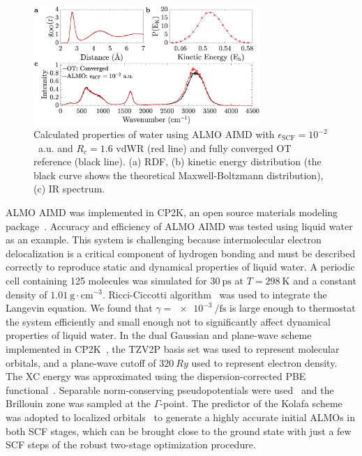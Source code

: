 \documentclass[aps,prl,reprint,amsmath,amssymb]{revtex4-1}
\begin{document}
\begin{figure}
\includegraphics[trim={1.3cm 0.1cm 3.3cm 1.3cm},clip,width=8.6cm]{Dynamical_Data_Tiled.eps}
\caption{\label{fig:dynproperties} 
Calculated properties of water using ALMO AIMD with $\epsilon_{\text{SCF}} = 10^{-2}$~a.u. and $R_{c} = 1.6$ vdWR (red line) and fully converged OT reference (black line).
(a) RDF, 
(b) kinetic energy distribution (the black curve shows the theoretical Maxwell-Boltzmann distribution), 
(c) IR spectrum.
}
\end{figure}

ALMO AIMD was implemented in CP2K, an open source materials modeling package~\cite{www:cp2k}. 
Accuracy and efficiency of ALMO AIMD was tested using liquid water as an example. 
This system is challenging because intermolecular electron delocalization is a critical component of hydrogen bonding and must be described correctly to reproduce static and dynamical properties of liquid water. 
A periodic cell containing 125 molecules was simulated for $\SI{30}{\ps}$ at $T=\SI{298}{\K}$ and a constant density of $\SI{1.01}{\g\cdot\cm^{-3}}$. 
Ricci-Ciccotti algorithm~\cite{Ricci2003} was used to integrate the Langevin equation. We found that $\gamma = \SI{e-3}{\per\fs}$ is large enough to thermostat the system efficiently and small enough not to significantly affect dynamical properties of liquid water.
%
In the dual Gaussian and plane-wave scheme implemented in CP2K~\cite{a:quickstep}, the TZV2P basis set was used to represent molecular orbitals, and a plane-wave cutoff of $\SI{320}{Ry}$ used to represent electron density. 
The XC energy was approximated using the dispersion-corrected PBE functional~\cite{a:PBEfunctional,Grimme2010}. 
Separable norm-conserving pseudopotentials were used~\cite{a:hgh} and the Brillouin zone was sampled at the $\Gamma$-point. 
%
The predictor of the Kolafa scheme~\cite{Kolafa2003} was adopted to localized orbitals~\cite{a:2ndcpmd} to generate a highly accurate initial ALMOs in both SCF stages, which can be brought close to the ground state with just a few SCF steps of the robust two-stage optimization procedure. 
\end{document}
